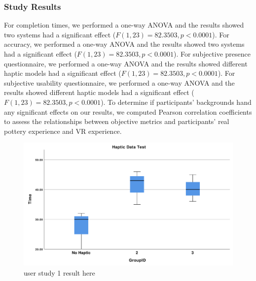 \documentclass{svjour3}                     %
\begin{document}
\subsubsection{Study Results}

For completion times, we performed a one-way ANOVA and the results showed two systems had a significant effect ($F(1, 23) = 82.3503, p < 0.0001$). 
For accuracy, we performed a one-way ANOVA and the results showed two systems had a significant effect ($F(1, 23) = 82.3503, p < 0.0001$). 
For subjective presence questionnaire, we performed a one-way ANOVA and the results showed different haptic models had a significant effect ($F(1, 23) = 82.3503, p < 0.0001$).
For subjective usability questionnaire, we performed a one-way ANOVA and the results showed different haptic models had a significant effect ($F(1, 23) = 82.3503, p < 0.0001$).
To determine if participants' backgrounds hand any significant effects on our results, we computed Pearson correlation coefficients to assess the relationships between objective metrics and participants' real pottery experience and VR experience.

\begin{figure}
	\includegraphics[width=\textwidth]{haptic_time.pdf}
	\caption{user study 1 result here}
	\label{fig:u1r}
\end{figure}
\end{document}
